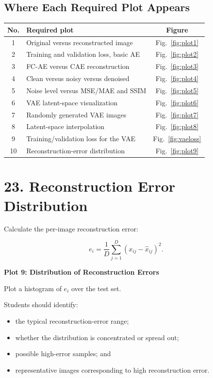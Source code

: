 \documentclass[10pt]{article}
\begin{document}
\subsection*{Where Each Required Plot Appears}

\begin{center}
\begin{tabular}{|c|l|c|}
\hline
No. & Required plot & Figure\\
\hline
1 & Original versus reconstructed image & Fig.~\ref{fig:plot1}\\
2 & Training and validation loss, basic AE & Fig.~\ref{fig:plot2}\\
3 & FC-AE versus CAE reconstruction & Fig.~\ref{fig:plot3}\\
4 & Clean versus noisy versus denoised & Fig.~\ref{fig:plot4}\\
5 & Noise level versus MSE/MAE and SSIM & Fig.~\ref{fig:plot5}\\
6 & VAE latent-space visualization & Fig.~\ref{fig:plot6}\\
7 & Randomly generated VAE images & Fig.~\ref{fig:plot7}\\
8 & Latent-space interpolation & Fig.~\ref{fig:plot8}\\
9 & Training/validation loss for the VAE & Fig.~\ref{fig:vaeloss}\\
10 & Reconstruction-error distribution & Fig.~\ref{fig:plot9}\\
\hline
\end{tabular}
\end{center}


\section*{23. Reconstruction Error Distribution}

Calculate the per-image reconstruction error:

\[
e_i=
\frac{1}{D}
\sum_{j=1}^{D}
(x_{ij}-\hat{x}_{ij})^2.
\]

\textbf{Plot 9: Distribution of Reconstruction Errors}

Plot a histogram of $e_i$ over the test set.

Students should identify:

\begin{itemize}
\item the typical reconstruction-error range;
\item whether the distribution is concentrated or spread out;
\item possible high-error samples; and
\item representative images corresponding to high reconstruction error.
\end{itemize}
\end{document}
